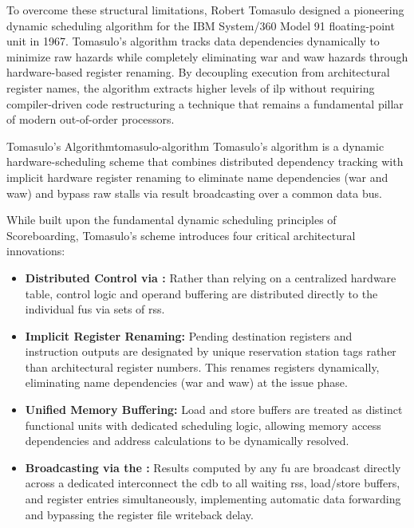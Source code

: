 To overcome these structural limitations, Robert Tomasulo designed a pioneering dynamic scheduling algorithm for the IBM System/360 Model 91 floating-point unit in 1967. Tomasulo's algorithm tracks data dependencies dynamically to minimize \gls{raw} hazards while completely eliminating \gls{war} and \gls{waw} hazards through hardware-based register renaming. By decoupling execution from architectural register names, the algorithm extracts higher levels of \gls{ilp} without requiring compiler-driven code restructuring a technique that remains a fundamental pillar of modern out-of-order processors.

\begin{definition}{Tomasulo's Algorithm}{tomasulo-algorithm}
Tomasulo's algorithm is a dynamic hardware-scheduling scheme that combines distributed dependency tracking with implicit hardware register renaming to eliminate name dependencies (\gls{war} and \gls{waw}) and bypass \gls{raw} stalls via result broadcasting over a common data bus.
\end{definition}

While built upon the fundamental dynamic scheduling principles of Scoreboarding, Tomasulo's scheme introduces four critical architectural innovations:

\begin{itemize}
\item \textbf{Distributed Control via :} Rather than relying on a centralized hardware table, control logic and operand buffering are distributed directly to the individual \glspl{fu} via sets of \glspl{rs}.
\item \textbf{Implicit Register Renaming:} Pending destination registers and instruction outputs are designated by unique reservation station tags rather than architectural register numbers. This renames registers dynamically, eliminating name dependencies (\gls{war} and \gls{waw}) at the issue phase.
\item \textbf{Unified Memory Buffering:} Load and store buffers are treated as distinct functional units with dedicated scheduling logic, allowing memory access dependencies and address calculations to be dynamically resolved.
\item \textbf{Broadcasting via the :} Results computed by any \gls{fu} are broadcast directly across a dedicated interconnect the \gls{cdb} to all waiting \glspl{rs}, load/store buffers, and register entries simultaneously, implementing automatic data forwarding and bypassing the register file writeback delay.
\end{itemize}

